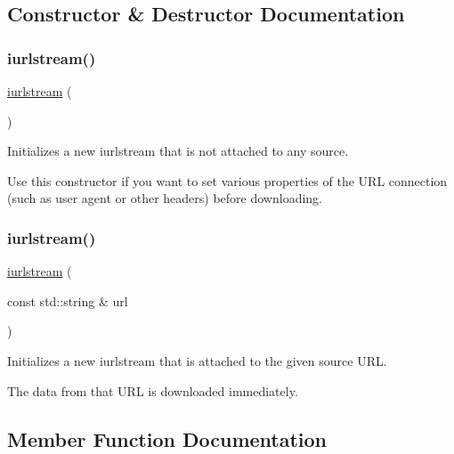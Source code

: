 \subsection{Constructor \& Destructor Documentation}
\mbox{\label{classiurlstream_aa78011981facda77bed9acf0e88ebdab}} 
\subsubsection{\texorpdfstring{iurlstream()}{iurlstream()}\hspace{0.1cm}{\footnotesize\ttfamily [1/2]}}
{\footnotesize\ttfamily \mbox{\hyperlink{classiurlstream}{iurlstream}} (\begin{DoxyParamCaption}{ }\end{DoxyParamCaption})}



Initializes a new iurlstream that is not attached to any source. 

Use this constructor if you want to set various properties of the U\+RL connection (such as user agent or other headers) before downloading. \mbox{\label{classiurlstream_a5fa5ba70cbe8c2ad3f93876c381464cb}} 
\subsubsection{\texorpdfstring{iurlstream()}{iurlstream()}\hspace{0.1cm}{\footnotesize\ttfamily [2/2]}}
{\footnotesize\ttfamily \mbox{\hyperlink{classiurlstream}{iurlstream}} (\begin{DoxyParamCaption}\item[{const std\+::string \&}]{url }\end{DoxyParamCaption})}



Initializes a new iurlstream that is attached to the given source U\+RL. 

The data from that U\+RL is downloaded immediately. 

\subsection{Member Function Documentation}
\mbox{\label{classiurlstream_a5ae591df94fc66ccb85cbb6565368bca}} 
